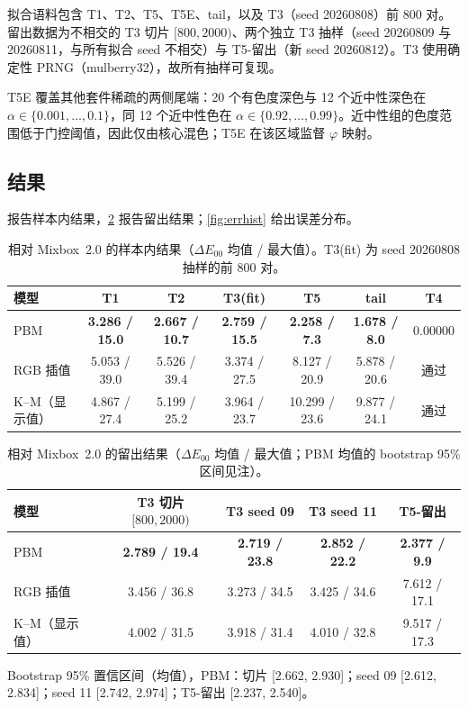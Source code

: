 拟合语料包含 T1、T2、T5、T5E、tail，以及 T3（seed 20260808）前 800 对。留出数据为不相交的 T3 切片 $[800,2000)$、两个独立 T3 抽样（seed 20260809 与 20260811，与所有拟合 seed 不相交）与 T5-留出（新 seed 20260812）。T3 使用确定性 PRNG（mulberry32），故所有抽样可复现。

T5E 覆盖其他套件稀疏的两侧尾端：20 个有色度深色与 12 个近中性深色在 $\alpha\in\{0.001,\dots,0.1\}$，同 12 个近中性色在 $\alpha\in\{0.92,\dots,0.99\}$。近中性组的色度范围低于门控阈值，因此仅由核心混色；T5E 在该区域监督 $\varphi$ 映射。

\subsection{结果}
\label{sec:results}

 报告样本内结果，\cref{tab:heldout} 报告留出结果；\cref{fig:errhist} 给出误差分布。

\begin{table}[t]
\centering
\footnotesize
\setlength{\tabcolsep}{3pt}
\caption{相对 Mixbox~2.0 的样本内结果（$\Delta E_{00}$ 均值 / 最大值）。T3(fit) 为 seed 20260808 抽样的前 800 对。}
\label{tab:insample}
\begin{tabular}{lcccccc}
\toprule
模型 & T1 & T2 & T3(fit) & T5 & tail & T4 \\
\midrule
PBM & \textbf{3.286 / 15.0} & \textbf{2.667 / 10.7} & \textbf{2.759 / 15.5} & \textbf{2.258 / 7.3} & \textbf{1.678 / 8.0} & 0.00000 \\
RGB 插值 & 5.053 / 39.0 & 5.526 / 39.4 & 3.374 / 27.5 & 8.127 / 20.9 & 5.878 / 20.6 & 通过 \\
K--M（显示值） & 4.867 / 27.4 & 5.199 / 25.2 & 3.964 / 23.7 & 10.299 / 23.6 & 9.877 / 24.1 & 通过 \\
\bottomrule
\end{tabular}
\end{table}

\begin{table}[t]
\centering
\footnotesize
\setlength{\tabcolsep}{3pt}
\caption{相对 Mixbox~2.0 的留出结果（$\Delta E_{00}$ 均值 / 最大值；PBM 均值的 bootstrap 95\% 区间见注）。}
\label{tab:heldout}
\begin{tabular}{lcccc}
\toprule
模型 & T3 切片 $[800,2000)$ & T3 seed 09 & T3 seed 11 & T5-留出 \\
\midrule
PBM & \textbf{2.789 / 19.4} & \textbf{2.719 / 23.8} & \textbf{2.852 / 22.2} & \textbf{2.377 / 9.9} \\
RGB 插值 & 3.456 / 36.8 & 3.273 / 34.5 & 3.425 / 34.6 & 7.612 / 17.1 \\
K--M（显示值） & 4.002 / 31.5 & 3.918 / 31.4 & 4.010 / 32.8 & 9.517 / 17.3 \\
\bottomrule
\end{tabular}

\smallskip
{\scriptsize Bootstrap 95\% 置信区间（均值），PBM：切片 [2.662, 2.930]；seed 09 [2.612, 2.834]；seed 11 [2.742, 2.974]；T5-留出 [2.237, 2.540]。}
\end{table}

